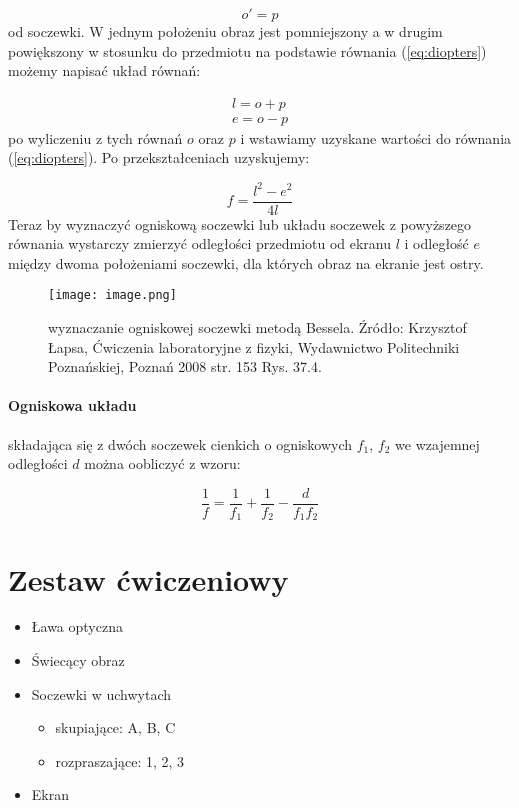 \documentclass{article}
\begin{document}
\begin{equation}
    o'=p
    \label{eq:op}
\end{equation}
od soczewki. W jednym położeniu obraz jest pomniejszony a w drugim powiększony w stosunku do przedmiotu na podstawie równania (\ref{eq:diopters}) możemy napisać układ równań:

\begin{align}
    l=o+p \nonumber\\
    e=o-p \nonumber
\end{align}
po wyliczeniu z tych równań $o$ oraz $p$ i wstawiamy uzyskane wartości do równania (\ref{eq:diopters}). Po przekształceniach uzyskujemy:

\begin{equation}
    f=\frac{l^2 - e^2}{4l} \label{eq:bessela}
\end{equation}
Teraz by wyznaczyć ogniskową soczewki lub układu soczewek z powyższego równania wystarczy zmierzyć odległości przedmiotu od ekranu $l$ i odległość $e$ między dwoma położeniami soczewki, dla których obraz na ekranie jest ostry.

\begin{figure}
    \centering
    \texttt{[image: image.png]}
    \caption{wyznaczanie ogniskowej soczewki metodą Bessela. Źródło: Krzysztof Łapsa, Ćwiczenia laboratoryjne z fizyki, Wydawnictwo Politechniki Poznańskiej, Poznań 2008 str. 153 Rys. 37.4.}
    \label{fig:bessel}
\end{figure}

\paragraph{Ogniskowa układu} składająca się z dwóch soczewek cienkich o ogniskowych $f_1$, $f_2$ we wzajemnej odległości $d$ można oobliczyć z wzoru: 

\begin{equation}
    \frac{1}{f} = \frac{1}{f_1} + \frac{1}{f_2} - \frac{d}{f_1 f_2}
    \label{eq:ogniskowa}
\end{equation}


\newpage
\section*{Zestaw ćwiczeniowy}

\begin{itemize}
    \item Ława optyczna
    \item Świecący obraz
    \item Soczewki w uchwytach \begin{itemize}
        \item skupiające: A, B, C
        \item rozpraszające: 1, 2, 3
    \end{itemize}
    \item Ekran
\end{itemize}
\end{document}
